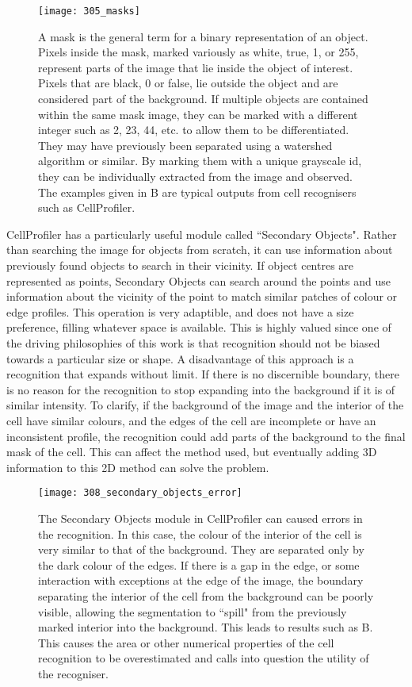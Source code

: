 \begin{figure}[h!]
 \centering
 \texttt{[image: 305\_masks]}
 \caption[Object masks]{
 	A mask is the general term for a binary representation of an object. Pixels inside the mask, marked variously as white, true, 1, or 255, represent parts of the image that lie inside the object of interest. Pixels that are black, 0 or false, lie outside the object and are considered part of the background. If multiple objects are contained within the same mask image, they can be marked with a different integer such as 2, 23, 44, etc. to allow them to be differentiated. They may have previously been separated using a watershed algorithm or similar. By marking them with a unique grayscale id, they can be individually extracted from the image and observed. The examples given in B are typical outputs from cell recognisers such as CellProfiler.
 }
 \label{fig:masks}
\end{figure}

CellProfiler has a particularly useful module called ``Secondary Objects". Rather than searching the image for objects from scratch, it can use information about previously found objects to search in their vicinity. If object centres are represented as points, Secondary Objects can search around the points and use information about the vicinity of the point to match similar patches of colour or edge profiles. This operation is very adaptible, and does not have a size preference, filling whatever space is available. This is highly valued since one of the driving philosophies of this work is that recognition should not be biased towards a particular size or shape. A disadvantage of this approach is a recognition that expands without limit. If there is no discernible boundary, there is no reason for the recognition to stop expanding into the background if it is of similar intensity. To clarify, if the background of the image and the interior of the cell have similar colours, and the edges of the cell are incomplete or have an inconsistent profile, the recognition could add parts of the background to the final mask of the cell. This can affect the method used, but eventually adding 3D information to this 2D method can solve the problem.

\begin{figure}[h!]
 \centering
 \texttt{[image: 308\_secondary\_objects\_error]}
 \caption[Secondary object error example]{
 	The Secondary Objects module in CellProfiler can caused errors in the recognition. In this case, the colour of the interior of the cell is very similar to that of the background. They are separated only by the dark colour of the edges. If there is a gap in the edge, or some interaction with exceptions at the edge of the image, the boundary separating the interior of the cell from the background can be poorly visible, allowing the segmentation to ``spill" from the previously marked interior into the background. This leads to results such as B. This causes the area or other numerical properties of the cell recognition to be overestimated and calls into question the utility of the recogniser.
 }
 \label{fig:secondaryobjecterror}
\end{figure}

